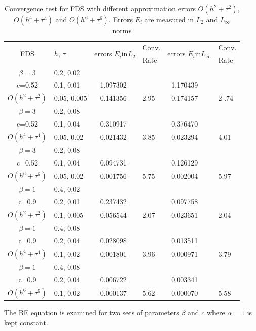 \documentclass[11pt,a4paper,twoside]{article}
\begin{document}
\begin{table}[ht]
\centering
\small
		\begin{tabular}{||c|l|ll|ll||}
			\hline
			\hline
      \multirow{2  }{*}{FDS}        & \multirow{2  }{*}{$h$, $\tau$}  & \multirow{2  }{*}{errors $E_i$in$L_2$}  &Conv.& \multirow{2  }{*}{errors $E_i$in$L_\infty$}  &Conv.  \\
	         &                    &                               & Rate   &                                        & Rate \\
   			\hline 
					\hline 
  $\beta=3$       &0.2, 0.02   &            &        &                  &      \\
      c=0.52   &0.1, 0.01   &~ 1.097302 &           &~1.170439      &       \\
     $O(h^2 + \tau^ 2)$ &0.05, 0.005 &~ 0.141356 &2.95  &~0.174157 & 2 .74       \\
			\hline 
   $\beta=3$        &0.2, 0.08   &            &        &                  &      \\
   c=0.52   &0.1, 0.04   &~ 0.310917 &           &~0.376470      &       \\
     $O(h^4+ \tau^4)$ &0.05, 0.02 &~ 0.021432 &3.85 &~0.023294 & 4.01        \\
			\hline 
  $\beta=3$               &0.2, 0.08   &            &        &                  &      \\
   c=0.52                  &0.1, 0.04       &~ 0.094731 &           &~0.126129      &       \\
     $O(h^6+ \tau^6)$ &0.05, 0.02 &~ 0.001756 &5.75    &~0.002004 & 5.97       \\
	   \hline
			\hline 
       $\beta=1$       &0.4, 0.02        &             &            &           &   \\
                  c=0.9    &0.2, 0.01       &~ 0.237432  &            &~0.097758 &   \\
  $O(h^2+ \tau^2)$ &0.1, 0.005   &~ 0.056544  &2.07  &~0.023651 & 2.04 \\
			\hline
      $\beta=1$    &0.4, 0.08    &            &            &             &    \\
       c=0.9 &0.2, 0.04    &~ 0.028098   &           &~0.013511  &   \\
       $O(h^4+ \tau^4)$ &0.1, 0.02   &~ 0.001801 & 3.96    &~0.000971  & 3.79  \\
    \hline
  $\beta=1$     &0.4, 0.08   &            &          &                  &      \\
      c=0.9    &0.2, 0.04   &~ 0.006722 &           &~0.003341      &       \\
     $O(h^6+ \tau^6)$ &0.1, 0.02 &~ 0.000137 &5.62  &~0.000070 & 5.58        \\
	   \hline
			\hline 
		\end{tabular}
		\caption{Convergence test for FDS with different approximation errors $O(h^{2} + \tau^2 )$, $O(h^{4} + \tau^4 )$ and $O(h^{6} + \tau^6 )$. Errors $E_i$ are measured in $L_2$ and $L_\infty$ norms}
\label{tab:a}
\end{table}
The BE equation  is examined for two sets of parameters $\beta$ and $c$ where $\alpha = 1$ is kept constant. 
\end{document}
